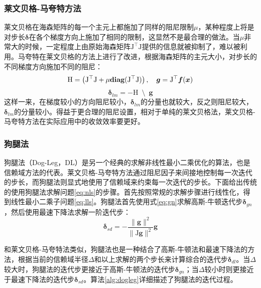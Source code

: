 \subsubsection*{莱文贝格-马夸特方法}

莱文贝格在海森矩阵的每一个主元上都施加了同样的阻尼限制$\mu$，某种程度上将是对步长$\bm{\delta}$在各个梯度方向上施加了相同的限制，这显然不是最合理的做法。当$\mu$非常大的时候，一定程度上由原始海森矩阵$\mathrm{J}^\top\mathrm{J}$提供的信息就被抑制了，难以被利用。马夸特在莱文贝格的方法上进行了改进，根据海森矩阵的主元大小，对步长的不同梯度方向施加不同的阻尼：
\begin{equation}
    \mathrm{H} = \left( \mathrm{J}^\top\mathrm{J}+\mu\mathbf{diag}(\mathrm{J}^\top\mathrm{J}) \right), \quad
    \bm{g}     = \mathrm{J}^\top\bm{f}(\bm{x}) \\
\end{equation}
\begin{equation}
    \bm{\delta}_{lm} = -\mathrm{H} \enspace\setminus\enspace \bm{g}
    \label{eq:lm}
\end{equation}
这样一来，在梯度较小的方向阻尼较小，$\bm{\delta}_{lm}$的分量也就较大，反之则阻尼较大，$\bm{\delta}_{lm}$的分量较小。得益于更合理的阻尼设置，相对于单纯的莱文贝格法，莱文贝格-马夸特方法在实际应用中的收敛效率要更好。

\subsubsection*{狗腿法}

狗腿法（Dog-Leg，DL）是另一个经典的求解非线性最小二乘优化的算法，也是信赖域方法的代表。莱文贝格-马夸特方法通过阻尼因子来间接地控制每一次迭代的步长，而狗腿法则显式地使用了信赖域来约束每一次迭代的步长。下面给出传统的使用狗腿法求解问题\eqref{eq:nls}的步骤\citep{tingleff2004methods}。首先按照常规的求解步骤进行线性化，得到线性最小二乘子问题\eqref{eq:lls}。狗腿法首先使用式\eqref{eq:gn}求解高斯-牛顿迭代步$\bm{\delta}_{gn}$，然后使用最速下降法求解一阶迭代步：
\begin{equation}
    \bm{\delta}_{sd} = -\frac{\lVert\bm{g}\rVert^2}{\lVert\mathrm{J}\bm{g}\rVert^2} \bm{g}
    \label{eq:sd}
\end{equation}

和莱文贝格-马夸特法类似，狗腿法也是一种结合了高斯-牛顿法和最速下降法的方法，根据当前的信赖域半径$\Delta$和以上求解的两个步长来计算综合的迭代步$\bm{\delta}_{dl}$。当$\Delta$较大时，狗腿法的迭代步更接近于高斯-牛顿法的迭代步$\bm{\delta}_{gn}$；当$\Delta$较小时则更接近于最速下降法的迭代步$\bm{\delta}_{sd}$。算法\ref{alg:dogleg}详细描述了狗腿法的迭代过程。

